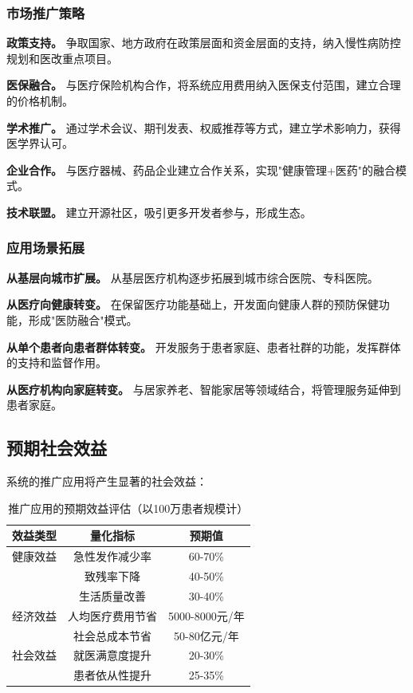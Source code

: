 \subsubsection{市场推广策略}

\textbf{政策支持。} 争取国家、地方政府在政策层面和资金层面的支持，纳入慢性病防控规划和医改重点项目。

\textbf{医保融合。} 与医疗保险机构合作，将系统应用费用纳入医保支付范围，建立合理的价格机制。

\textbf{学术推广。} 通过学术会议、期刊发表、权威推荐等方式，建立学术影响力，获得医学界认可。

\textbf{企业合作。} 与医疗器械、药品企业建立合作关系，实现"健康管理+医药"的融合模式。

\textbf{技术联盟。} 建立开源社区，吸引更多开发者参与，形成生态。

\subsubsection{应用场景拓展}

\textbf{从基层向城市扩展。} 从基层医疗机构逐步拓展到城市综合医院、专科医院。

\textbf{从医疗向健康转变。} 在保留医疗功能基础上，开发面向健康人群的预防保健功能，形成"医防融合"模式。

\textbf{从单个患者向患者群体转变。} 开发服务于患者家庭、患者社群的功能，发挥群体的支持和监督作用。

\textbf{从医疗机构向家庭转变。} 与居家养老、智能家居等领域结合，将管理服务延伸到患者家庭。

\subsection{预期社会效益}

系统的推广应用将产生显著的社会效益：

\begin{table}[H]
  \centering
  \caption{推广应用的预期效益评估（以100万患者规模计）}
  \label{tab:benefits}
  \begin{tabularx}{\textwidth}{CCC}
    \toprule
    效益类型 & 量化指标 & 预期值 \\
    \midrule
    健康效益 & 急性发作减少率 & 60-70\% \\
    & 致残率下降 & 40-50\% \\
    & 生活质量改善 & 30-40\% \\
    \midrule
    经济效益 & 人均医疗费用节省 & 5000-8000元/年 \\
    & 社会总成本节省 & 50-80亿元/年 \\
    \midrule
    社会效益 & 就医满意度提升 & 20-30\% \\
    & 患者依从性提升 & 25-35\% \\
    \bottomrule
  \end{tabularx}
\end{table}
